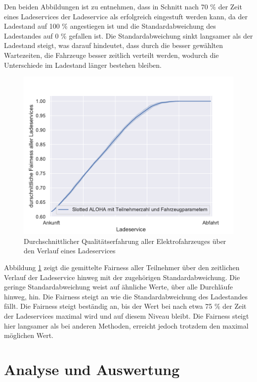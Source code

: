Den beiden Abbildungen ist zu entnehmen, dass in Schnitt nach 70 \% der Zeit eines Ladeservices der Ladeservice als erfolgreich eingestuft werden kann, da der Ladestand auf 100 \% angestiegen ist und die Standardabweichung des Ladestandes auf 0 \% gefallen ist. Die Standardabweichung sinkt langsamer als der Ladestand steigt, was darauf hindeutet, dass durch die besser gewählten Wartezeiten, die Fahrzeuge besser zeitlich verteilt werden, wodurch die Unterschiede im Ladestand länger bestehen bleiben.\\
\begin{figure}[htb]
\centering
	\includegraphics[scale=0.6]{img/Sa_wT_trafo/SlottedAloha_waitingTime_VDE_tau_trafo_13_qoe.pdf}
	\caption{Durchschnittlicher Qualitätserfahrung aller Elektrofahrzeuges über den Verlauf eines Ladeservices}
	\label{Abb_SAwtTrafo_Fairness}
\end{figure}
Abbildung \ref{Abb_SAwtTrafo_Fairness} zeigt die gemittelte Fairness aller Teilnehmer über den zeitlichen Verlauf der Ladeservice hinweg mit der zugehörigen Standardabweichung. Die geringe Standardabweichung weist auf ähnliche Werte, über alle Durchläufe hinweg, hin. Die Fairness steigt an wie die Standardabweichung des Ladestandes fällt. Die Fairness steigt beständig an, bis der Wert bei nach etwa 75 \% der Zeit der Ladeservices maximal wird und auf diesem Niveau bleibt. Die Fairness steigt hier langsamer als bei anderen Methoden, erreicht jedoch trotzdem den maximal möglichen Wert.

\section{Analyse und Auswertung}

